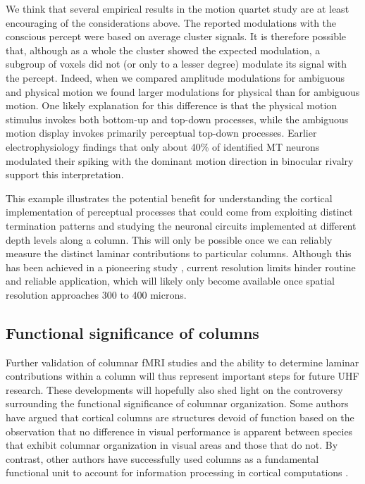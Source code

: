 We think that several empirical results in the motion quartet study are at least encouraging of the considerations above. The reported modulations with the conscious percept were based on average cluster signals. It is therefore possible that, although as a whole the cluster showed the expected modulation, a subgroup of voxels did not (or only to a lesser degree) modulate its signal with the percept. Indeed, when we compared amplitude modulations for ambiguous and physical motion we found larger modulations for physical than for ambiguous motion. One likely explanation for this difference is that the physical motion stimulus invokes both bottom-up and top-down processes, while the ambiguous motion display invokes primarily perceptual top-down processes. Earlier electrophysiology findings that only about 40\% of identified MT neurons modulated their spiking with the dominant motion direction in binocular rivalry \parencite{Logothetis1989} support this interpretation.

This example illustrates the potential benefit for understanding the cortical implementation of perceptual processes that could come from exploiting distinct termination patterns and studying the neuronal circuits implemented at different depth levels along a column. This will only be possible once we can reliably measure the distinct laminar contributions to particular columns. Although this has been achieved in a pioneering study \parencite{DeMartino2015}, current resolution limits hinder routine and reliable application, which will likely only become available once spatial resolution approaches 300 to 400 microns.

\subsection{Functional significance of columns}
Further validation of columnar fMRI studies and the ability to determine laminar contributions within a column will thus represent important steps for future UHF research. These developments will hopefully also shed light on the controversy surrounding the functional significance of columnar organization. Some authors have argued that cortical columns are structures devoid of function \parencite{Horton2005} based on the observation that no difference in visual performance is apparent between species that exhibit columnar organization in visual areas and those that do not. By contrast, other authors have successfully used columns as a fundamental functional unit to account for information processing in cortical computations \parencite{Bastos2012}.

